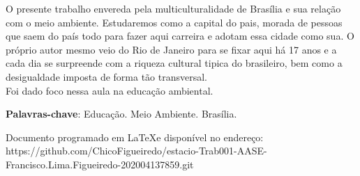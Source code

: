 
\setlength{\absparsep}{18pt} %
\begin{resumo}
 O presente trabalho envereda pela multiculturalidade de Brasília e sua relação com o meio ambiente. Estudaremos como a capital do pais, morada de pessoas que saem do país todo para fazer aqui carreira e adotam essa cidade como sua. O próprio autor mesmo veio do Rio de Janeiro para se fixar aqui há 17 anos e a cada dia se surpreende com a riqueza cultural tipica do brasileiro, bem como a desigualdade imposta de forma tão transversal. \\
 Foi dado foco nessa aula na educação ambiental.

 \textbf{Palavras-chave}: Educação. Meio Ambiente. Brasília.
\end{resumo}

Documento programado em \LaTeX e disponível no endereço: https://github.com/ChicoFigueiredo/estacio-Trab001-AASE-Francisco.Lima.Figueiredo-202004137859.git
